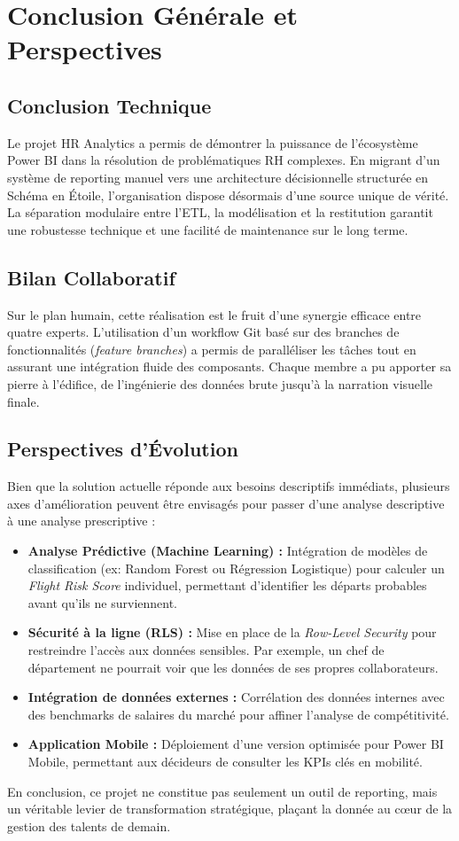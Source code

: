 \chapter{Conclusion Générale et Perspectives}

\section{Conclusion Technique}
Le projet HR Analytics a permis de démontrer la puissance de l'écosystème Power BI dans la résolution de problématiques RH complexes. En migrant d'un système de reporting manuel vers une architecture décisionnelle structurée en Schéma en Étoile, l'organisation dispose désormais d'une source unique de vérité. La séparation modulaire entre l'ETL, la modélisation et la restitution garantit une robustesse technique et une facilité de maintenance sur le long terme.

\section{Bilan Collaboratif}
Sur le plan humain, cette réalisation est le fruit d'une synergie efficace entre quatre experts. L'utilisation d'un workflow Git basé sur des branches de fonctionnalités (\textit{feature branches}) a permis de paralléliser les tâches tout en assurant une intégration fluide des composants. Chaque membre a pu apporter sa pierre à l'édifice, de l'ingénierie des données brute jusqu'à la narration visuelle finale.

\section{Perspectives d'Évolution}
Bien que la solution actuelle réponde aux besoins descriptifs immédiats, plusieurs axes d'amélioration peuvent être envisagés pour passer d'une analyse descriptive à une analyse prescriptive :

\begin{itemize}
    \item \textbf{Analyse Prédictive (Machine Learning) :} Intégration de modèles de classification (ex: Random Forest ou Régression Logistique) pour calculer un \textit{Flight Risk Score} individuel, permettant d'identifier les départs probables avant qu'ils ne surviennent.
    \item \textbf{Sécurité à la ligne (RLS) :} Mise en place de la \textit{Row-Level Security} pour restreindre l'accès aux données sensibles. Par exemple, un chef de département ne pourrait voir que les données de ses propres collaborateurs.
    \item \textbf{Intégration de données externes :} Corrélation des données internes avec des benchmarks de salaires du marché pour affiner l'analyse de compétitivité.
    \item \textbf{Application Mobile :} Déploiement d'une version optimisée pour Power BI Mobile, permettant aux décideurs de consulter les KPIs clés en mobilité.
\end{itemize}

En conclusion, ce projet ne constitue pas seulement un outil de reporting, mais un véritable levier de transformation stratégique, plaçant la donnée au cœur de la gestion des talents de demain.
